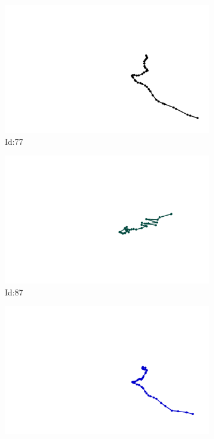 \documentclass[12pt,twoside]{report}
\begin{document}
\begin{figure}
\centering
\begin{subfigure}[b]{0.20\textwidth}
\centering
\includegraphics[width=\textwidth]{../../trajectories/77.png}
\caption{Id:77}
\end{subfigure}
\begin{subfigure}[b]{0.20\textwidth}
\centering
\includegraphics[width=\textwidth]{../../trajectories/87.png}
\caption{Id:87}
\end{subfigure}
\begin{subfigure}[b]{0.20\textwidth}
\centering
\includegraphics[width=\textwidth]{../../trajectories/186.png}

\end{subfigure}
\end{figure}
\end{document}
